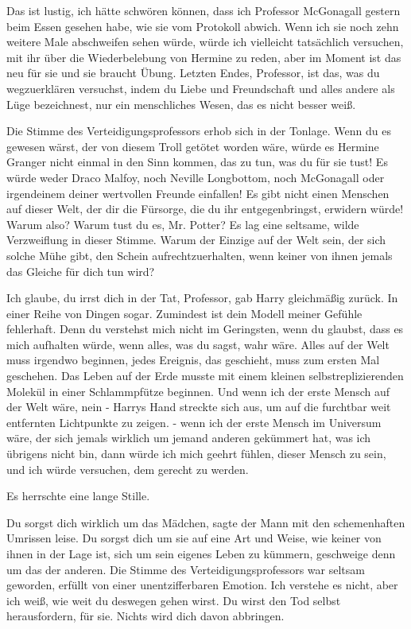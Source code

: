 \glqq Das ist lustig, ich hätte schwören können, dass ich Professor McGonagall
gestern beim Essen gesehen habe, wie sie vom Protokoll abwich. Wenn ich sie noch
zehn weitere Male abschweifen sehen würde, würde ich vielleicht tatsächlich
versuchen, mit ihr über die Wiederbelebung von Hermine zu reden, aber im Moment
ist das neu für sie und sie braucht Übung. Letzten Endes, Professor, ist das,
was du wegzuerklären versuchst, indem du Liebe und Freundschaft und alles andere
als Lüge bezeichnest, nur ein menschliches Wesen, das es nicht besser
weiß.\grqq{}

Die Stimme des Verteidigungsprofessors erhob sich in der Tonlage. \glqq Wenn du
es gewesen wärst, der von diesem Troll getötet worden wäre, würde es Hermine
Granger nicht einmal in den Sinn kommen, das zu tun, was du für sie tust! Es
würde weder Draco Malfoy, noch Neville Longbottom, noch McGonagall oder
irgendeinem deiner wertvollen Freunde einfallen! Es gibt nicht einen Menschen
auf dieser Welt, der dir die Fürsorge, die du ihr entgegenbringst, erwidern
würde! Warum also? Warum tust du es, Mr. Potter?\grqq{} Es lag eine seltsame,
wilde Verzweiflung in dieser Stimme. \glqq Warum der Einzige auf der Welt sein,
der sich solche Mühe gibt, den Schein aufrechtzuerhalten, wenn keiner von ihnen
jemals das Gleiche für dich tun wird?\grqq{}

\glqq Ich glaube, du irrst dich in der Tat, Professor\grqq{}, gab Harry
gleichmäßig zurück. \glqq In einer Reihe von Dingen sogar. Zumindest ist dein
Modell meiner Gefühle fehlerhaft. Denn du verstehst mich nicht im Geringsten,
wenn du glaubst, dass es mich aufhalten würde, wenn alles, was du sagst, wahr
wäre. Alles auf der Welt muss irgendwo beginnen, jedes Ereignis, das geschieht,
muss zum ersten Mal geschehen. Das Leben auf der Erde musste mit einem kleinen
selbstreplizierenden Molekül in einer Schlammpfütze beginnen. Und wenn ich der
erste Mensch auf der Welt wäre, nein -\grqq{} Harrys Hand streckte sich aus, um
auf die furchtbar weit entfernten Lichtpunkte zu zeigen. \glqq - wenn ich der
erste Mensch im Universum wäre, der sich jemals wirklich um jemand anderen
gekümmert hat, was ich übrigens nicht bin, dann würde ich mich geehrt fühlen,
dieser Mensch zu sein, und ich würde versuchen, dem gerecht zu werden.\grqq{}

Es herrschte eine lange Stille.

\glqq Du sorgst dich wirklich um das Mädchen\grqq{}, sagte der Mann mit den
schemenhaften Umrissen leise. \glqq Du sorgst dich um sie auf eine Art und
Weise, wie keiner von ihnen in der Lage ist, sich um sein eigenes Leben zu
kümmern, geschweige denn um das der anderen.\grqq{} Die Stimme des
Verteidigungsprofessors war seltsam geworden, erfüllt von einer unentzifferbaren
Emotion. \glqq Ich verstehe es nicht, aber ich weiß, wie weit du deswegen gehen
wirst. Du wirst den Tod selbst herausfordern, für sie. Nichts wird dich davon
abbringen.\grqq{}

